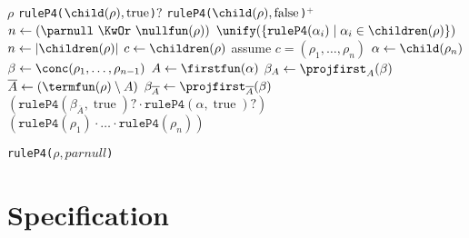 \documentclass[a4paper,11pt, svgnames,titlepage]{article}
\newcommand{\rxp}{{^\mathtt{+}}}
\newcommand{\rxo}{\mathtt{?}}
\newcommand{\rxc}{\cdot}
\newcommand{\true}{\ensuremath{\operatorname{true}}\xspace}
\newcommand{\false}{\ensuremath{\operatorname{false}}\xspace}
\begin{document}
\begin{algorithm2e}[H]
	\SetAlgoLined

		{\Return $\rho$}
		{\Return \texttt{ruleP4(}$\child(\rho),\true$\texttt{)}$\rxo$}
		{\Return \texttt{ruleP4(}$\child(\rho),\false$\texttt{)}$\rxp$}
	{
		$n\leftarrow (\parnull\ \KwOr\ \nullfun(\rho))$\;
		\Return $\unify(\{\mathtt{ruleP4(}\alpha_i\mathtt{)}\mid \alpha_i\in\children(\rho)\})$\;
	}
	\Else
	{
		$n\leftarrow |\children(\rho)|$\;
		$c\leftarrow \children(\rho)$\;
		assume $c=(\rho_1,\ldots,\rho_n)$\;
		{
			$\alpha\leftarrow \child(\rho_n)$\;
			$\beta\leftarrow \conc(\rho_1,\ldots,\rho_{n-1})$\;
			$A\leftarrow \firstfun(\alpha)$\; 
			$\beta_A\leftarrow \projfirst_{A}(\beta)$\;			
			{
				$\overline{A}\leftarrow (\termfun(\rho)\setminus A)$\; 
				$\beta_{\overline{A}}\leftarrow \projfirst_{\overline{A}}(\beta)$\;
				\Return $(\mathtt{ruleP4}(\beta_{\overline{A}},\true)\rxo \rxc \mathtt{ruleP4}(\alpha,\true)\rxo)$\;
			}
		}
		\Return $(\mathtt{ruleP4}(\rho_{1})\rxc \ldots \rxc \mathtt{ruleP4}(\rho_{n}))$\;
	}


	\caption{\texttt{ruleP4(}$\rho,parnull$\texttt{)}}
\end{algorithm2e}
\section{Specification}\label{sec:spec}
\end{document}
